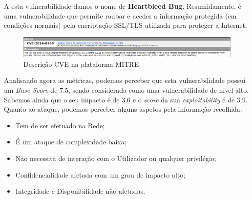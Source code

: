 \documentclass[11t]{article}
\begin{document}
\vspace{0.1cm}

A esta vulnerabilidade damos o nome de \textbf{Heartbleed Bug}. Resumidamente, é uma vulnerabilidade que permite roubar e aceder a informação protegida (em condições normais) pela encriptação SSL/TLS utilizada para proteger a Internet.


\vspace{0.2cm}

\begin{figure}[H]
    \centering
    \includegraphics[width=\textwidth]{images/descricaoPergunta3.png}
    \caption{Descrição CVE na plataforma MITRE}
\end{figure}

\vspace{0.4cm}

Analisando agora as métricas, podemos perceber que esta vulnerabilidade possui um \textit{Base Score} de 7.5, sendo considerada como uma vulnerabilidade de nível alto. Sabemos ainda que o seu impacto é de 3.6 e o \textit{score} da sua \textit{exploitability} é de 3.9. Quanto ao ataque, podemos perceber alguns aspetos pela informação recolhida:
\begin{itemize}
    \item Tem de ser efetuado na Rede;
    \item É um ataque de complexidade baixa;
    \item Não necessita de interação com o Utilizador ou qualquer privilégio;
    \item Confidencialidade afetada com um grau de impacto alto;
    \item Integridade e Disponibilidade não afetadas.
\end{itemize}
\end{document}
